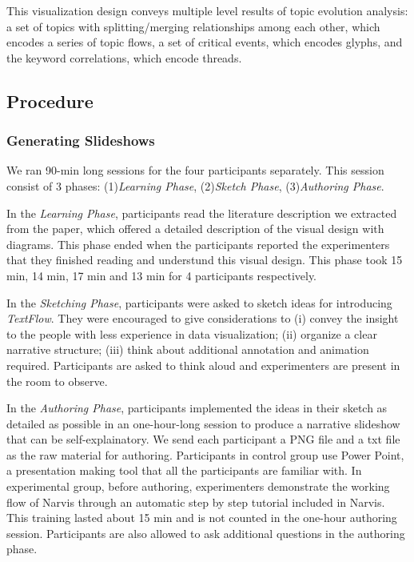 This visualization design conveys multiple level results of topic evolution analysis: a set of topics
with splitting/merging relationships among each other, which encodes a series of topic flows, a set of critical events, which encodes glyphs, and the keyword correlations, which encode threads.  

\subsection{Procedure}
\subsubsection{Generating Slideshows}
We ran 90-min long sessions for the four participants separately. This session consist of 3 phases: (1)\textit{Learning Phase}, (2)\textit{Sketch Phase}, (3)\textit{Authoring Phase}.

In the \textit{Learning Phase}, participants read the literature description we extracted from the paper, which offered a detailed description of the visual design with diagrams. This phase ended when the participants reported the experimenters that they finished reading and understund this visual design. 
This phase took 15 min, 14 min, 17 min and 13 min for 4 participants respectively.

In the \textit{Sketching Phase}, participants were asked to sketch ideas for introducing \textit{TextFlow}. They were encouraged to give considerations to (i) convey the insight to the people with less experience in data visualization; (ii) organize a clear narrative structure; (iii) think about additional annotation and animation required. Participants are asked to think aloud and experimenters are present in the room to observe. 

In the \textit{Authoring Phase}, participants implemented the ideas in their sketch as detailed as possible in an one-hour-long session to produce a narrative slideshow that can be self-explainatory. We send each participant a PNG file and a txt file as the raw material for authoring. Participants in control group use Power Point, a presentation making tool that all the participants are familiar with. In experimental group, before authoring, experimenters demonstrate the working flow of Narvis through an automatic step by step tutorial included in Narvis. This training lasted about 15 min and is not counted in the one-hour authoring session. Participants are also allowed to ask additional questions in the authoring phase.

